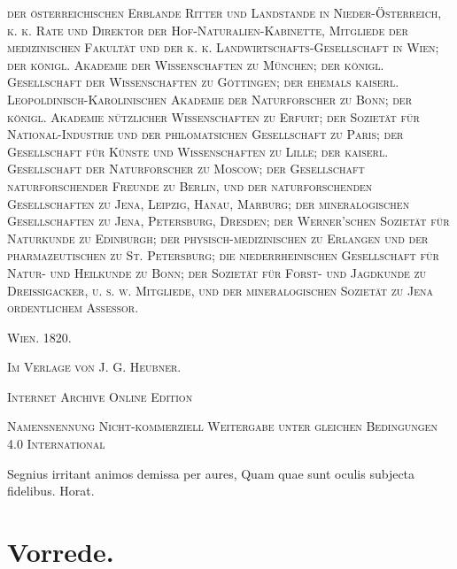 \documentclass[a4paper, 11pt, oneside, german]{article}
\begin{document}
\begin{titlepage}
    {\scshape\footnotesize der österreichischen Erblande Ritter und Landstande in Nieder-Österreich, k. k. Rate und Direktor der Hof-Naturalien-Kabinette, Mitgliede der medizinischen Fakultät und der k. k. Landwirtschafts-Gesellschaft in Wien; der königl. Akademie der Wissenschaften zu München; der königl. Gesellschaft der Wissenschaften zu Göttingen; der ehemals kaiserl. Leopoldinisch-Karolinischen Akademie der Naturforscher zu Bonn; der königl. Akademie nützlicher Wissenschaften zu Erfurt; der Sozietät für National-Industrie und der philomatsichen Gesellschaft zu Paris; der Gesellschaft für Künste und Wissenschaften zu Lille; der kaiserl. Gesellschaft der Naturforscher zu Moscow; der Gesellschaft naturforschender Freunde zu Berlin, und der naturforschenden Gesellschaften zu Jena, Leipzig, Hanau, Marburg; der mineralogischen Gesellschaften zu Jena, Petersburg, Dresden; der Werner'schen Sozietät für Naturkunde zu Edinburgh; der physisch-medizinischen zu Erlangen und der pharmazeutischen zu St. Petersburg; die niederrheinischen Gesellschaft für Natur- und Heilkunde zu Bonn; der Sozietät für Forst- und Jagdkunde zu Dreissigacker, u. s. w. Mitgliede, und der mineralogischen Sozietät zu Jena ordentlichem Assessor.} %
    
    \vspace*{\fill}

	\vspace{1\baselineskip}

	{\small\scshape Wien. 1820.}
	
	{\small\scshape{Im Verlage von J. G. Heubner.}}
	
	\vspace{0.5\baselineskip} %

    \scshape Internet Archive Online Edition  %
	
	{\scshape\small Namensnennung Nicht-kommerziell Weitergabe unter gleichen Bedingungen 4.0 International} %
\end{titlepage}
\setlength{\parskip}{1mm plus1mm minus1mm}
\clearpage
\tableofcontents
\clearpage
Segnius irritant animos demissa per aures,
Quam quae sunt oculis subjecta fidelibus.
Horat.
\clearpage
\section*{Vorrede.}
\end{document}
